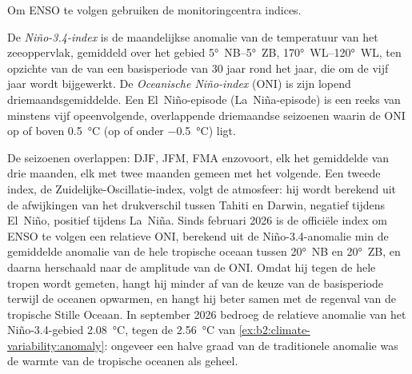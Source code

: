 Om ENSO te volgen gebruiken de monitoringcentra indices.

\begin{definition}\label{def:b2:climate-variability:oni}
De \emph{Niño-3.4-index} is de maandelijkse anomalie van de temperatuur van het
zeeoppervlak, gemiddeld over het gebied \ang{5}~NB--\ang{5}~ZB, \ang{170}~WL--\ang{120}~WL, ten opzichte van
de  van een basisperiode van 30 jaar rond het jaar, die om de vijf jaar wordt bijgewerkt. De
\emph{Oceanische Niño-index} (ONI) is zijn lopend driemaandsgemiddelde. Een
El~Niño-episode (La~Niña-episode) is een reeks van minstens vijf opeenvolgende, overlappende driemaandse seizoenen
waarin de ONI op of boven \qty{+0.5}{\celsius} (op of onder \qty{-0.5}{\celsius}) ligt.
\end{definition}

De seizoenen overlappen: DJF, JFM, FMA enzovoort, elk het gemiddelde van drie maanden, elk met twee
maanden gemeen met het volgende. Een tweede index, de Zuidelijke-Oscillatie-index, volgt de atmosfeer: hij
wordt berekend uit de afwijkingen van het drukverschil tussen Tahiti en Darwin, negatief
tijdens El~Niño, positief tijdens La~Niña. Sinds februari 2026 is de officiële index om ENSO te
volgen een relatieve ONI, berekend uit de Niño-3.4-anomalie min de gemiddelde anomalie van de hele
tropische oceaan tussen \ang{20}~NB en \ang{20}~ZB, en daarna herschaald naar de amplitude van de ONI. Omdat hij
tegen de hele tropen wordt gemeten, hangt hij minder af van de keuze van de basisperiode terwijl de oceanen
opwarmen, en hangt hij beter samen met de regenval van de tropische Stille Oceaan. In september 2026 bedroeg de
relatieve anomalie van het Niño-3.4-gebied \qty{2.08}{\celsius}, tegen de \qty{2.56}{\celsius}
van \cref{ex:b2:climate-variability:anomaly}: ongeveer een halve graad van de traditionele anomalie was de
warmte van de tropische oceanen als geheel.

